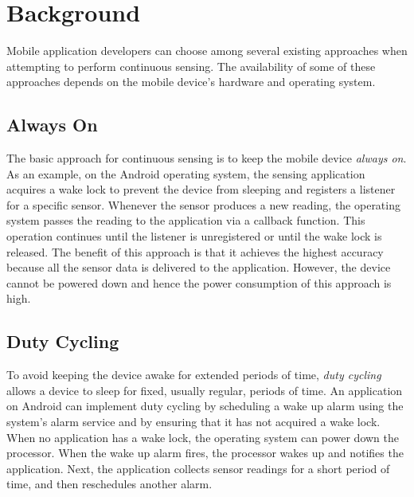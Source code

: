 
\section{Background}
\label{sec:background}

Mobile application developers can choose among several existing approaches when
attempting to perform continuous sensing. The availability of some of these
approaches depends on the mobile device's hardware and operating system.

\subsection{Always On}

The basic approach for continuous sensing is to keep the mobile device
\emph{always on}. As an example, on the Android operating system, the sensing
application acquires a wake lock to prevent the device from sleeping and
registers a listener for a specific sensor. Whenever the sensor produces a new
reading, the operating system passes the reading to the application via a
callback function. This operation continues until the listener is unregistered
or until the wake lock is released. The benefit of this approach is that it
achieves the highest accuracy because all the sensor data is delivered to the
application. However, the device cannot be powered down and hence the power
consumption of this approach is high.

\subsection{Duty Cycling}

To avoid keeping the device awake for extended periods of time, \emph{duty
  cycling} allows a device to sleep for fixed, usually regular, periods of
time. An application on Android can implement duty cycling by scheduling a wake
up alarm using the system's alarm service and by ensuring that it has not
acquired a wake lock. When no application has a wake lock, the operating system
can power down the processor. When the wake up alarm fires, the processor wakes
up and notifies the application. Next, the application collects sensor readings
for a short period of time, and then reschedules another alarm.


